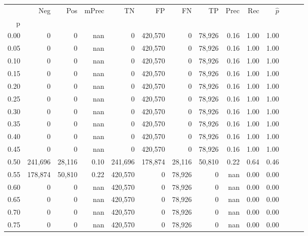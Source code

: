 \begin{tabular}{rrrrrrrrrrrrrr}
\toprule
{} &      Neg &     Pos & mPrec &       TN &       FP &      FN &      TP &  Prec &   Rec & $\hat{p}$ \\
p    &          &         &       &          &          &         &         &       &       &           \\
\midrule
0.00 &        0 &       0 &   nan &        0 &  420,570 &       0 &  78,926 &  0.16 &  1.00 &      1.00 \\
0.05 &        0 &       0 &   nan &        0 &  420,570 &       0 &  78,926 &  0.16 &  1.00 &      1.00 \\
0.10 &        0 &       0 &   nan &        0 &  420,570 &       0 &  78,926 &  0.16 &  1.00 &      1.00 \\
0.15 &        0 &       0 &   nan &        0 &  420,570 &       0 &  78,926 &  0.16 &  1.00 &      1.00 \\
0.20 &        0 &       0 &   nan &        0 &  420,570 &       0 &  78,926 &  0.16 &  1.00 &      1.00 \\
0.25 &        0 &       0 &   nan &        0 &  420,570 &       0 &  78,926 &  0.16 &  1.00 &      1.00 \\
0.30 &        0 &       0 &   nan &        0 &  420,570 &       0 &  78,926 &  0.16 &  1.00 &      1.00 \\
0.35 &        0 &       0 &   nan &        0 &  420,570 &       0 &  78,926 &  0.16 &  1.00 &      1.00 \\
0.40 &        0 &       0 &   nan &        0 &  420,570 &       0 &  78,926 &  0.16 &  1.00 &      1.00 \\
0.45 &        0 &       0 &   nan &        0 &  420,570 &       0 &  78,926 &  0.16 &  1.00 &      1.00 \\
0.50 &  241,696 &  28,116 &  0.10 &  241,696 &  178,874 &  28,116 &  50,810 &  0.22 &  0.64 &      0.46 \\
0.55 &  178,874 &  50,810 &  0.22 &  420,570 &        0 &  78,926 &       0 &   nan &  0.00 &      0.00 \\
0.60 &        0 &       0 &   nan &  420,570 &        0 &  78,926 &       0 &   nan &  0.00 &      0.00 \\
0.65 &        0 &       0 &   nan &  420,570 &        0 &  78,926 &       0 &   nan &  0.00 &      0.00 \\
0.70 &        0 &       0 &   nan &  420,570 &        0 &  78,926 &       0 &   nan &  0.00 &      0.00 \\
0.75 &        0 &       0 &   nan &  420,570 &        0 &  78,926 &       0 &   nan &  0.00 &      0.00 \\

\end{tabular}
